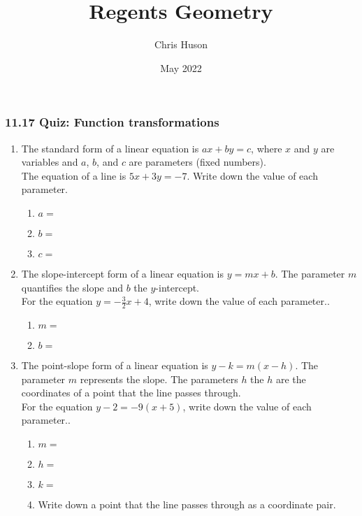 \documentclass[12pt, twoside]{article}
\title{Regents Geometry}
\author{Chris Huson}
\date{May 2022}
\begin{document}
\subsubsection*{11.17 Quiz: Function transformations}
\begin{enumerate}
\item The standard form of a linear equation is $ax+by=c$, where $x$ and $y$ are variables and $a$, $b$, and $c$ are parameters (fixed numbers).\\[0.25cm]
The equation of a line is $5x+3y=-7$. Write down the value of each parameter.
  \begin{enumerate}
    \item $a=$
    \vspace{0.5cm}
    \item $b=$
    \vspace{0.5cm}
    \item $c=$
  \end{enumerate} \vspace{0.2cm}

\item The slope-intercept form of a linear equation is $y=mx+b$. The parameter $m$ quantifies the slope and $b$ the $y$-intercept.\\[0.25cm]
For the equation $y=-\frac{3}{2}x+4$, write down the value of each parameter..
  \begin{enumerate}
    \item $m=$
    \vspace{0.5cm}
    \item $b=$
    \vspace{0.2cm}
  \end{enumerate}

\item The point-slope form of a linear equation is $y-k=m(x-h)$. The parameter $m$ represents the slope. The parameters $h$ the $h$ are the coordinates of a point that the line passes through.\\[0.25cm]
For the equation $y-2=-9(x+5)$, write down the value of each parameter..
  \begin{enumerate}
    \item $m=$
    \vspace{0.5cm}
    \item $h=$
    \vspace{0.5cm}
    \item $k=$
    \vspace{0.5cm}
    \item Write down a point that the line passes through as a coordinate pair.
  \end{enumerate}
  

\end{enumerate}
\end{document}
